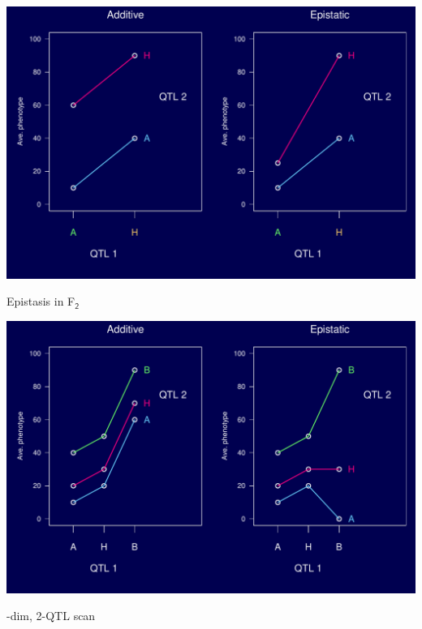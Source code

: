 \documentclass[12pt]{article}
\newcommand{\headsize}{\fontsize{35}{35} \selectfont}
\begin{document}
\vfill

\centerline{\includegraphics{FigsB/epistasis_bc.pdf}}


\newpage

\headsize \color{myyellow}
\hfill \begin{minipage}{5.75in}
\centering
Epistasis in F$_{\mathsf{2}}$
\end{minipage}

\vfill

\centerline{\includegraphics{FigsB/epistasis_f2.pdf}}



\newpage

\headsize \color{myyellow}
\hfill \begin{minipage}{5.75in}
-dim, 2-QTL scan
\end{minipage}

\vspace{2cm}
\end{document}
